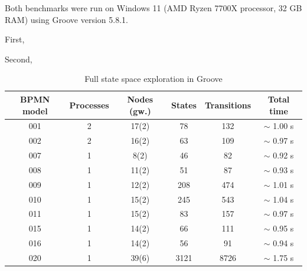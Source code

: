 \documentclass[runningheads]{llncs}
\begin{document}
Both benchmarks were run on Windows 11 (AMD Ryzen 7700X processor, 32 GB RAM) using Groove version 5.8.1.

First,

Second,


\begin{table}[ht]
\centering

\begin{tabular}{| c | c | c || c | c | c |}
 \hline
 BPMN model & Processes & Nodes (gw.) & States & Transitions & Total time \\
 \hline\hline
 001 & 2 & 17(2) & 78 & 132 & $\sim$ 1.00 s \\
 \hline
 002 & 2 & 16(2) & 63 & 109 & $\sim$ 0.97 s \\
 \hline
 007 & 1 & 8(2) & 46 & 82 & $\sim$ 0.92 s \\
 \hline
 008 & 1 & 11(2) & 51 & 87 & $\sim$ 0.93 s \\
 \hline
 009 & 1 & 12(2) & 208 & 474 & $\sim$ 1.01 s \\
 \hline
 010 & 1 & 15(2) & 245 & 543 & $\sim$ 1.04 s \\
 \hline
 011 & 1 & 15(2) & 83 & 157 & $\sim$ 0.97 s \\
 \hline
 015 & 1 & 14(2) & 66 & 111 & $\sim$ 0.95 s \\
 \hline
 016 & 1 & 14(2) & 56 & 91 & $\sim$ 0.94 s \\
 \hline
 020 & 1 & 39(6) & 3121 & 8726 & $\sim$ 1.75 s \\
 \hline
\end{tabular}
\caption[Full state space exploration in Groove]{Full state space exploration in Groove}
\label{table:grooveRuntime}
\end{table}
\end{document}
